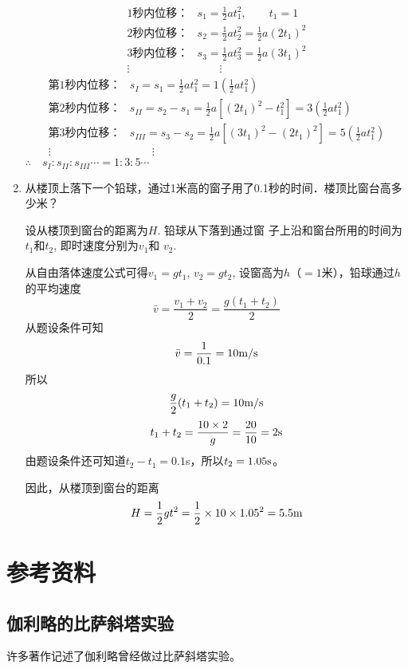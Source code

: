 \begin{enumerate}
\begin{solution}
\[\begin{split}
    \text{1秒内位移：} & s_1=\frac{1}{2}at^2_1, \qquad t_1=1\\
    \text{2秒内位移：} & s_2=\frac{1}{2}at^2_2=\frac{1}{2}a(2t_1)^2\\
    \text{3秒内位移：} & s_3=\frac{1}{2}at^2_3=\frac{1}{2}a(3t_1)^2\\
    \vdots& \qquad \vdots
\end{split}\]
\[\begin{split}
    \text{第1秒内位移：} & s_I=s_1=\frac{1}{2}at^2_1=1\left(\frac{1}{2}at^2_1\right)\\
    \text{第2秒内位移：} & s_{II}=s_2-s_1=\frac{1}{2}a\left[(2t_1)^2-t^2_1\right]=3\left(\frac{1}{2}at^2_1\right)\\
    \text{第3秒内位移：} & s_{III}=s_3-s_2=\frac{1}{2}a\left[(3t_1)^2-(2t_1)^2\right]=5\left(\frac{1}{2}at^2_1\right)\\
    \vdots& \qquad \vdots
\end{split}\]
$\therefore\quad s_I:s_{II}:s_{III}\cdots=1:3:5\cdots$
\end{solution}
	\item 从楼顶上落下一个铅球，通过1米高的窗子用了0.1秒的时间．楼顶比窗台高多少米？

    \begin{solution}
设从楼顶到窗台的距离为$H$. 铅球从下落到通过窗
子上沿和窗台所用的时间为$t_1$和$t_2$, 即时速度分别为$v_1$和
$v_2$.

从自由落体速度公式可得$v_1=gt_1$, $v_2=gt_2$, 
设窗高为$h$（$=1$米），铅球通过$h$的平均速度
\[\bar v=\frac{v_1+v_2}{2}=\frac{g(t_1+t_2)}{2}\]
从题设条件可知
\[\bar v=\frac{1}{0.1}=10\text{m}/\text{s}\]
所以
\[\frac{g}{2}(t_1+t_2)=10\text{m}/\text{s}\]
\[t_1+t_2=\frac{10\times 2}{g}=\frac{20}{10}=2{\rm s}\]
由题设条件还可知道$t_2-t_1=0.1$s，所以$t_2=1.05{\rm s}$。

因此，从楼顶到窗台的距离
\[H=\frac{1}{2}gt^2=\frac{1}{2}\times 10\times 1.05^2=5.5{\rm m}\]   \end{solution}
\end{enumerate}

\section{参考资料}
\subsection{伽利略的比萨斜塔实验}
许多著作记述了伽利略曾经做过比萨斜塔实验。

